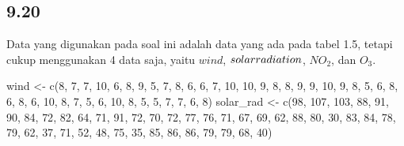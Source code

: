 \documentclass[
]{article}
\newenvironment{Shaded}{\begin{snugshade}}{\end{snugshade}}
\newcommand{\DecValTok}[1]{\textcolor[rgb]{0.00,0.00,0.81}{#1}}
\newcommand{\FunctionTok}[1]{\textcolor[rgb]{0.00,0.00,0.00}{#1}}
\newcommand{\NormalTok}[1]{#1}
\newcommand{\OtherTok}[1]{\textcolor[rgb]{0.56,0.35,0.01}{#1}}
\begin{document}
\hypertarget{section-2}{%
\subsection{9.20}\label{section-2}}

Data yang digunakan pada soal ini adalah data yang ada pada tabel 1.5,
tetapi cukup menggunakan 4 data saja, yaitu \(wind\),
\(solar \space radiation\), \(NO_{2}\), dan \(O_{3}\).

\begin{Shaded}
\begin{Highlighting}[]
\NormalTok{wind }\OtherTok{\textless{}{-}} \FunctionTok{c}\NormalTok{(}\DecValTok{8}\NormalTok{, }\DecValTok{7}\NormalTok{, }\DecValTok{7}\NormalTok{, }\DecValTok{10}\NormalTok{, }\DecValTok{6}\NormalTok{, }\DecValTok{8}\NormalTok{, }\DecValTok{9}\NormalTok{, }\DecValTok{5}\NormalTok{, }\DecValTok{7}\NormalTok{, }\DecValTok{8}\NormalTok{, }\DecValTok{6}\NormalTok{, }\DecValTok{6}\NormalTok{, }\DecValTok{7}\NormalTok{, }\DecValTok{10}\NormalTok{, }\DecValTok{10}\NormalTok{, }\DecValTok{9}\NormalTok{, }\DecValTok{8}\NormalTok{, }\DecValTok{8}\NormalTok{, }\DecValTok{9}\NormalTok{, }\DecValTok{9}\NormalTok{, }\DecValTok{10}\NormalTok{, }\DecValTok{9}\NormalTok{, }\DecValTok{8}\NormalTok{, }\DecValTok{5}\NormalTok{, }\DecValTok{6}\NormalTok{, }\DecValTok{8}\NormalTok{, }\DecValTok{6}\NormalTok{, }\DecValTok{8}\NormalTok{, }\DecValTok{6}\NormalTok{, }\DecValTok{10}\NormalTok{, }\DecValTok{8}\NormalTok{, }\DecValTok{7}\NormalTok{, }\DecValTok{5}\NormalTok{, }\DecValTok{6}\NormalTok{, }\DecValTok{10}\NormalTok{, }\DecValTok{8}\NormalTok{, }\DecValTok{5}\NormalTok{, }\DecValTok{5}\NormalTok{, }\DecValTok{7}\NormalTok{, }\DecValTok{7}\NormalTok{, }\DecValTok{6}\NormalTok{, }\DecValTok{8}\NormalTok{)}
\NormalTok{solar\_rad }\OtherTok{\textless{}{-}} \FunctionTok{c}\NormalTok{(}\DecValTok{98}\NormalTok{, }\DecValTok{107}\NormalTok{, }\DecValTok{103}\NormalTok{, }\DecValTok{88}\NormalTok{, }\DecValTok{91}\NormalTok{, }\DecValTok{90}\NormalTok{, }\DecValTok{84}\NormalTok{, }\DecValTok{72}\NormalTok{, }\DecValTok{82}\NormalTok{, }\DecValTok{64}\NormalTok{, }\DecValTok{71}\NormalTok{, }\DecValTok{91}\NormalTok{, }\DecValTok{72}\NormalTok{, }\DecValTok{70}\NormalTok{, }\DecValTok{72}\NormalTok{, }\DecValTok{77}\NormalTok{, }\DecValTok{76}\NormalTok{, }\DecValTok{71}\NormalTok{, }\DecValTok{67}\NormalTok{, }\DecValTok{69}\NormalTok{, }\DecValTok{62}\NormalTok{, }\DecValTok{88}\NormalTok{, }\DecValTok{80}\NormalTok{, }\DecValTok{30}\NormalTok{, }\DecValTok{83}\NormalTok{, }\DecValTok{84}\NormalTok{, }\DecValTok{78}\NormalTok{, }\DecValTok{79}\NormalTok{, }\DecValTok{62}\NormalTok{, }\DecValTok{37}\NormalTok{, }\DecValTok{71}\NormalTok{, }\DecValTok{52}\NormalTok{, }\DecValTok{48}\NormalTok{, }\DecValTok{75}\NormalTok{, }\DecValTok{35}\NormalTok{, }\DecValTok{85}\NormalTok{, }\DecValTok{86}\NormalTok{, }\DecValTok{86}\NormalTok{, }\DecValTok{79}\NormalTok{, }\DecValTok{79}\NormalTok{, }\DecValTok{68}\NormalTok{, }\DecValTok{40}\NormalTok{)}

\end{Highlighting}
\end{Shaded}
\end{document}
